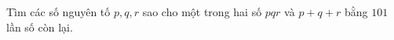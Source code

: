 \ifshowproblem
\begin{problem}\label{example:NMC-2015-P2}
    Tìm các số nguyên tố \( p, q, r \) sao cho một trong hai số \( pqr \) và \( p + q + r \) bằng \( 101 \) lần số còn lại.
\end{problem}
\fi

\fi